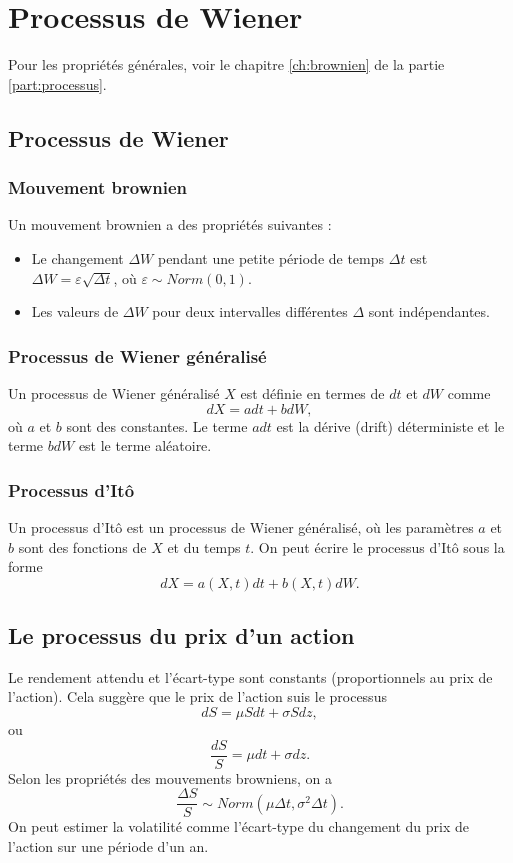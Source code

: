 \chapter{Processus de Wiener}
Pour les propriétés générales, voir le chapitre \ref{ch:brownien} de la partie \ref{part:processus}.
\section{Processus de Wiener}

\subsection{Mouvement brownien}
Un mouvement brownien a des propriétés suivantes : 

\begin{itemize}
	\item Le changement $\Delta W$ pendant une petite période de temps $\Delta t$ est $\Delta W = \varepsilon \sqrt{\Delta t}$, où $\varepsilon\sim Norm(0, 1)$. 
	\item Les valeurs de $\Delta W$ pour deux intervalles différentes $\Delta$ sont indépendantes. 
\end{itemize}


\subsection{Processus de Wiener généralisé}

Un processus de Wiener généralisé $X$ est définie en termes de $dt$ et $dW$ comme
$$dX = adt + bdW,$$
où $a$ et $b$ sont des constantes. Le terme $adt$ est la dérive (drift) déterministe et le terme $bdW$ est le terme aléatoire.

\subsection{Processus d'Itô}

Un processus d'Itô est un processus de Wiener généralisé, où les paramètres $a$ et $b$ sont des fonctions de $X$ et du temps $t$. On peut écrire le processus d'Itô sous la forme
$$dX = a(X, t) dt + b(X, t)dW.$$

\section{Le processus du prix d'un action}

Le rendement attendu et l'écart-type sont constants (proportionnels au prix de l'action). Cela suggère que le prix de l'action suis le processus
$$dS = \mu S dt + \sigma S dz,$$
ou
$$\frac{dS}{S} = \mu dt + \sigma dz.$$
Selon les propriétés des mouvements browniens, on a
$$\frac{\Delta S}{S} \sim Norm(\mu \Delta t, \sigma^2 \Delta t).$$
On peut estimer la volatilité comme l'écart-type du changement du prix de l'action sur une période d'un an. 

